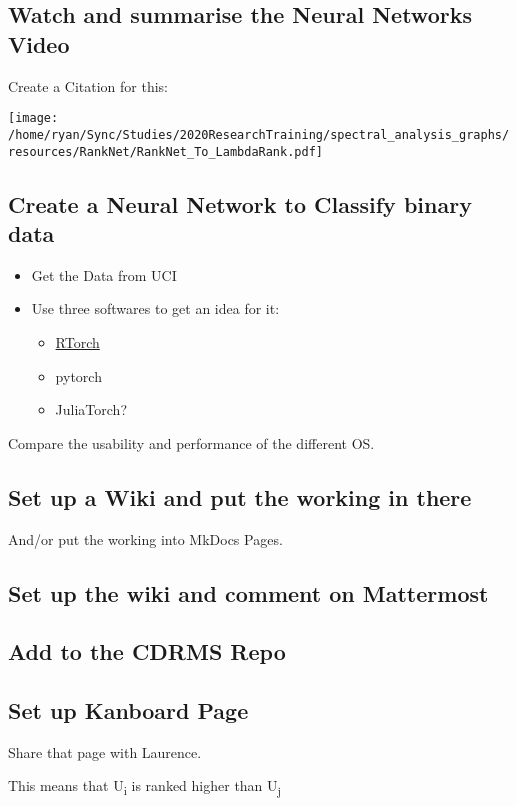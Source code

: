 \documentclass[a4paper,11pt,twoside]{article}
\begin{document}
\subsection{Watch and summarise the Neural Networks Video}
\label{sec:org92a7cdf}
Create a Citation for this:
\begin{center}
\texttt{[image: /home/ryan/Sync/Studies/2020ResearchTraining/spectral\_analysis\_graphs/resources/RankNet/RankNet\_To\_LambdaRank.pdf]}
\end{center}

\subsection{Create a Neural Network to Classify binary data}
\label{sec:org8c1546f}

\begin{itemize}
\item Get the Data from UCI
\item Use three softwares to get an idea for it:
\begin{itemize}
\item \href{https://blog.rstudio.com/2020/09/29/torch/}{RTorch}
\item pytorch
\item JuliaTorch?
\end{itemize}
\end{itemize}

Compare the usability and performance of the different OS.
\subsection{Set up a Wiki and put the working in there}
\label{sec:org6274777}
And/or put the working into MkDocs Pages.
\subsection{Set up the wiki and comment on Mattermost}
\label{sec:org25b7f58}
\subsection{Add to the CDRMS Repo}
\label{sec:org75f642c}
\subsection{Set up Kanboard Page}
\label{sec:org3608499}
Share that page with Laurence.

This means that U\textsubscript{i} is ranked higher than U\textsubscript{j}
\end{document}
